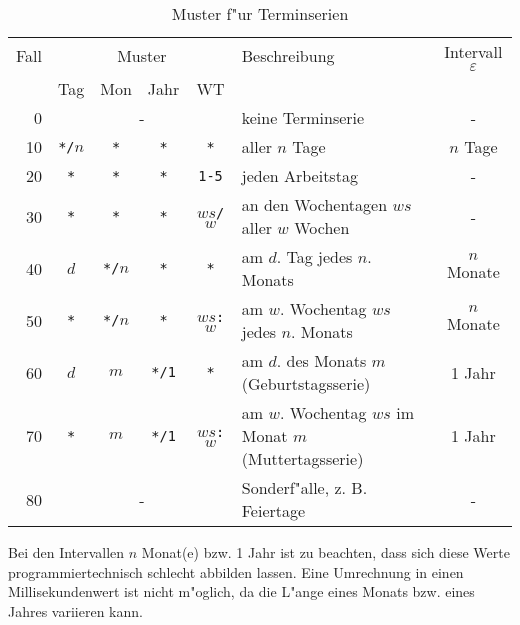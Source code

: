 \documentclass[a4paper]{article}
\numberwithin{equation}{section}
\begin{document}
\setcounter{footnote}{1}
\begin{table}[ht]
  \caption{Muster f"ur Terminserien}
  \label{tab:pattern}
  \begin{tabularx}{\textwidth}{rccccXc}
    \hline
    Fall & \multicolumn{4}{c}{Muster} & Beschreibung & Intervall $\varepsilon$ \\
    & Tag & Mon & Jahr & WT & & \\
    \hline
    0 & \multicolumn{4}{c}{-} & keine Terminserie & - \\
    10 & \texttt{*/$n$} & \texttt{*} & \texttt{*} & \texttt{*} &
      aller $n$ Tage & $n$ Tage \\
    20 & \texttt{*} & \texttt{*} & \texttt{*} & \texttt{1-5} &
      jeden Arbeitstag & - \\
    30 & \texttt{*} & \texttt{*} & \texttt{*} & \texttt{$ws$/$w$} &
      an den Wochentagen $ws$ aller $w$ Wochen & - \\
    40 & \texttt{$d$} & \texttt{*/$n$} & \texttt{*} & \texttt{*} &
      am $d$. Tag jedes $n$. Monats & $n$ Monate \\
    50 & \texttt{*} & \texttt{*/$n$} & \texttt{*} & \texttt{$ws$:$w$} &
      am $w$. Wochentag $ws$ jedes $n$. Monats &
      $n$ Monate\footnotemark[\ref{ft:oneMonth}] \\
    60 & \texttt{$d$} & \texttt{$m$} & \texttt{*/1} & \texttt{*} &
      am $d$. des Monats $m$ (Geburtstagsserie) & 1 Jahr \\
    70 & \texttt{*} & \texttt{$m$} & \texttt{*/1} & \texttt{$ws$:$w$} &
      am $w$. Wochentag $ws$ im Monat $m$ (Muttertagsserie) &
      1 Jahr\footnotemark[\ref{ft:oneMonth}] \\
    80 & \multicolumn{4}{c}{-} & Sonderf"alle, z. B. Feiertage & - \\
    \hline
  \end{tabularx}
\end{table}

\label{badInterval}
Bei den Intervallen $n$ Monat(e) bzw. 1 Jahr ist zu beachten, dass sich diese
Werte programmiertechnisch schlecht abbilden lassen. Eine Umrechnung in einen
Millisekundenwert ist nicht m"oglich, da die L"ange eines Monats bzw. eines
Jahres variieren kann.



%
%
%
%
\end{document}
